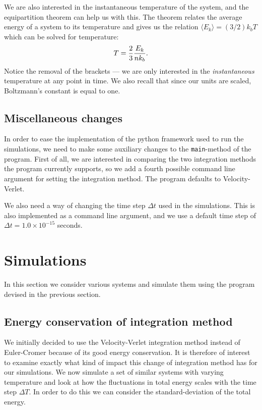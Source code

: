 \documentclass[a4paper]{article}
\begin{document}
    We are also interested in the instantaneous temperature of the system, and
    the equipartition theorem \cite{equipar} can help us with this. The theorem
    relates the average energy of a system to its temperature and gives us the
    relation $\langle E_k \rangle = (3/2)k_bT$ which can be solved for
    temperature:
    \begin{equation}
        \notag
        T = \frac{2}{3} \frac{E_k}{nk_b}.
    \end{equation}
    Notice the removal of the brackets --- we are only interested in the
    \emph{instantaneous} temperature at any point in time. We also recall that
    since our units are scaled, Boltzmann's constant is equal to one.
    
    \subsection{Miscellaneous changes}
    \label{sub:miscellaneous_changes}
    
    In order to ease the implementation of the python framework used to run the
    simulations, we need to make some auxiliary changes to the
    \texttt{main}-method of the program. First of all, we are interested in
    comparing the two integration methods the program currently supports, so we
    add a fourth possible command line argument for setting the integration
    method. The program defaults to Velocity-Verlet.  
    
    We also need a way of changing the time step $\Delta t$ used in the
    simulations. This is also implemented as a command line argument, and we
    use a default time step of $\Delta t = 1.0 \times 10^{-15}$ seconds.

    \section{Simulations}
\label{sec:simulations}

In this section we consider various systems and simulate them using the program
devised in the previous section.

\subsection{Energy conservation of integration method}
\label{sub:energy_conservation_of_integration_method}

We initially decided to use the Velocity-Verlet integration method instead of
Euler-Cromer because of its good energy conservation. It is therefore of
interest to examine exactly what kind of impact this change of integration
method has for our simulations.  We now simulate a set of similar systems with
varying temperature and look at how the fluctuations in total energy scales
with the time step $\Delta T$. In order to do this we can consider the
standard-deviation of the total energy. 
\end{document}
